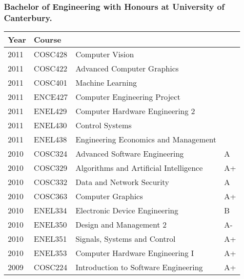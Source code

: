 \documentclass[10pt]{article}
\begin{document}
        \subsubsection*{Bachelor of Engineering with Honours at University of Canterbury.}
            {\footnotesize
            \begin{tabularx}{\textwidth}{llXl}
                \hline
                \textbf{Year} & \textbf{Course} & & \\
                \hline
                2011 & COSC428 & Computer Vision                                    &      \\
                2011 & COSC422 & Advanced Computer Graphics                         &      \\
                2011 & COSC401 & Machine Learning                                   &      \\
                2011 & ENCE427 & Computer Engineering Project                       &      \\
                2011 & ENEL429 & Computer Hardware Engineering 2                    &      \\
                2011 & ENEL430 & Control Systems                                    &      \\
                2011 & ENEL438 & Engineering Economics and Management               &      \\
                2010 & COSC324 & Advanced Software Engineering                      & A    \\
                2010 & COSC329 & Algorithms and Artificial Intelligence             & A+   \\
                2010 & COSC332 & Data and Network Security                          & A    \\
                2010 & COSC363 & Computer Graphics                                  & A+   \\
                2010 & ENEL334 & Electronic Device Engineering                      & B    \\
                2010 & ENEL350 & Design and Management 2                            & A-   \\
                2010 & ENEL351 & Signals, Systems and Control                       & A+   \\
                2010 & ENEL353 & Computer Hardware Engineering I                    & A+   \\
                2009 & COSC224 & Introduction to Software Engineering               & A+   \\

\end{tabularx}}
\end{document}
